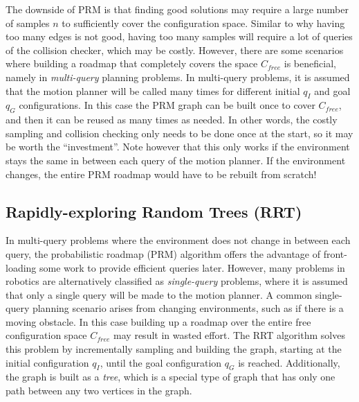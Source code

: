The downside of PRM is that finding good solutions may require a large number of samples $n$ to sufficiently cover the configuration space. Similar to why having too many edges is not good, having too many samples will require a lot of queries of the collision checker, which may be costly. However, there are some scenarios where building a roadmap that completely covers the space $C_{free}$ is beneficial, namely in \textit{multi-query} planning problems. In multi-query problems, it is assumed that the motion planner will be called many times for different initial $q_I$ and goal $q_G$ configurations. In this case the PRM graph can be built once to cover $C_{free}$, and then it can be reused as many times as needed. In other words, the costly sampling and collision checking only needs to be done once at the start, so it may be worth the ``investment''. Note however that this only works if the environment stays the same in between each query of the motion planner. If the environment changes, the entire PRM roadmap would have to be rebuilt from scratch!

\subsection{Rapidly-exploring Random Trees (RRT)}
In multi-query problems where the environment does not change in between each query, the probabilistic roadmap (PRM) algorithm offers the advantage of front-loading some work to provide efficient queries later. However, many problems in robotics are alternatively classified as \textit{single-query} problems, where it is assumed that only a single query will be made to the motion planner. A common single-query planning scenario arises from changing environments, such as if there is a moving obstacle. In this case building up a roadmap over the entire free configuration space $C_{free}$ may result in wasted effort. The RRT algorithm solves this problem by incrementally sampling and building the graph, starting at the initial configuration $q_I$, until the goal configuration $q_G$ is reached. Additionally, the graph is built as a \textit{tree}, which is a special type of graph that has only one path between any two vertices in the graph.

